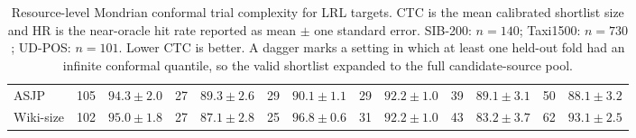 \begin{table}[t]
{\begin{tabular}{l*{12}{c}}
ASJP & 105 & $94.3 \pm 2.0$ & 27 & $89.3 \pm 2.6$ & 29 & $90.1 \pm 1.1$ & 29 & $92.2 \pm 1.0$ & 39 & $89.1 \pm 3.1$ & 50 & $88.1 \pm 3.2$ \\
Wiki-size & 102 & $95.0 \pm 1.8$ & 27 & $87.1 \pm 2.8$ & 25 & $96.8 \pm 0.6$ & 31 & $92.2 \pm 1.0$ & 43 & $83.2 \pm 3.7$ & 62 & $93.1 \pm 2.5$ \\
\bottomrule
\end{tabular}%
}
\caption{Resource-level Mondrian conformal trial complexity for LRL targets. CTC is the mean calibrated shortlist size and HR is the near-oracle hit rate reported as mean $\pm$ one standard error. SIB-200: $n=140$; Taxi1500: $n=730$; UD-POS: $n=101$. Lower CTC is better. A dagger marks a setting in which at least one held-out fold had an infinite conformal quantile, so the valid shortlist expanded to the full candidate-source pool.}
\label{tab:mondrian-ctc-lrl}
\end{table}
